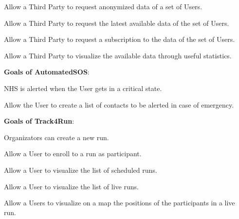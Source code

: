 \begin{goalList}
\begin{enumerate}[label={[}G3.\arabic*{]}]
    \item \label{goal:parties4}Allow a Third Party to request anonymized data of a set of Users.
    
     \begin{enumerate}[label={[}G3.5.\arabic*{]}]
        \item \label{goal:parties5}Allow a Third Party to request the latest available data of the set of Users.
        \item \label{goal:parties6}Allow a Third Party to request a subscription to the data of the set of Users.
    \end{enumerate}
    
    \item \label{goal:parties7}Allow a Third Party to visualize the available data through useful statistics.
    \newline
    
\end{enumerate}

\textbf{Goals of AutomatedSOS}:
\begin{enumerate}[label={[}G4.\arabic*{]}]

\item \label{goal:sos1}NHS is alerted when the User gets in a critical state.
\item \label{goal:sos2}Allow the User to create a list of contacts to be alerted in case of emergency.
    
\end{enumerate}
\newpage

\textbf{Goals of Track4Run}:
\begin{enumerate}[label={[}G5.\arabic*{]}]

    \item \label{goal:run1}Organizators can create a new run.
    \item \label{goal:run2}Allow a User to enroll to a run as participant.
    \item \label{goal:run3}Allow a User to visualize the list of scheduled runs.
     \item\label{goal:run4}Allow a User to visualize the list of live runs.
    \item \label{goal:run5}Allow a Users to visualize on a map the positions of the participants in a live run.
   
    
\end{enumerate}
\end{goalList}
